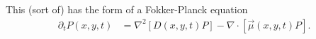 \documentclass[english, parskip=full]{scrartcl}
\newcommand{\intx}{}
\newcommand{\klam}{}
\newcommand{\oper}{}
\newcommand{\tecxt}{}
\begin{document}
This (sort of) has the form of a Fokker-Planck equation 
\begin{align}
\partial_t P(x,y,t) &= \nabla^2[D(x,y,t)P] - \nabla\cdot \klam\left[ \vec{\mu}(x,y,t)P \right].
\end{align}

\end{document}
